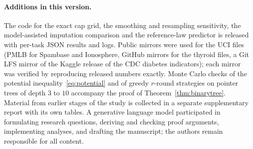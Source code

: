 \paragraph{Additions in this version.}
The code for the exact cap grid, the smoothing and resampling sensitivity, the model-assisted imputation comparison and the reference-law predictor is released with per-task JSON results and logs. Public mirrors were used for the UCI files (PMLB for Spambase and Ionosphere, GitHub mirrors for the thyroid files, a Git LFS mirror of the Kaggle release of the CDC diabetes indicators); each mirror was verified by reproducing released numbers exactly. Monte Carlo checks of the potential inequality~\eqref{eq:potential} and of greedy $r$-round strategies on pointer trees of depth $3$ to $10$ accompany the proof of Theorem~\ref{thm:binarytree}. Material from earlier stages of the study is collected in a separate supplementary report with its own tables. A generative language model participated in formulating research questions, deriving and checking proof arguments, implementing analyses, and drafting the manuscript; the authors remain responsible for all content.
